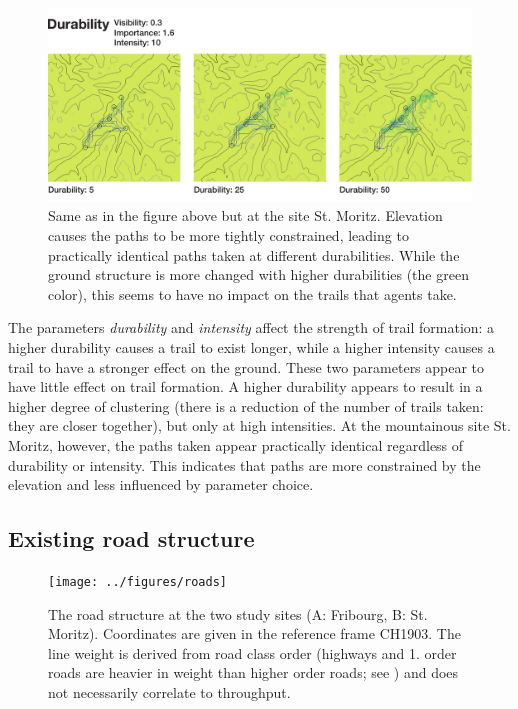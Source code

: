 \documentclass[a4paper, DIV11, abstracton]{scrartcl}
\begin{document}
\begin{figure}[tbp]
	\includegraphics[width=\linewidth]{../figures/durability2}
	\caption{Same as in the figure above but at the site St. Moritz. Elevation causes the paths to be more tightly constrained, leading to practically identical paths taken at different durabilities. While the ground structure is more changed with higher durabilities (the green color), this seems to have no impact on the trails that agents take.}
	\label{fig:durability2}
\end{figure}

The parameters \emph{durability} and \emph{intensity} affect the strength of trail formation: a higher durability causes a trail to exist longer, while a higher intensity causes a trail to have a stronger effect on the ground. These two parameters appear to have little effect on trail formation. A higher durability appears to result in a higher degree of clustering (there is a reduction of the number of trails taken: they are closer together), but only at high intensities. At the mountainous site St. Moritz, however, the paths taken appear practically identical regardless of durability or intensity. This indicates that paths are more constrained by the elevation and less influenced by parameter choice.




\subsection{Existing road structure}
\label{sec:roads}

\begin{figure}[tbp]
	\texttt{[image: ../figures/roads]}
	\caption{The road structure at the two study sites (A: Fribourg, B: St. Moritz). Coordinates are given in the reference frame CH1903. The line weight is derived from road class order (highways and 1. order roads are heavier in weight than higher order roads; see \citet{vector25}) and does not necessarily correlate to throughput.}
	\label{fig:roads}
\end{figure}
\end{document}
